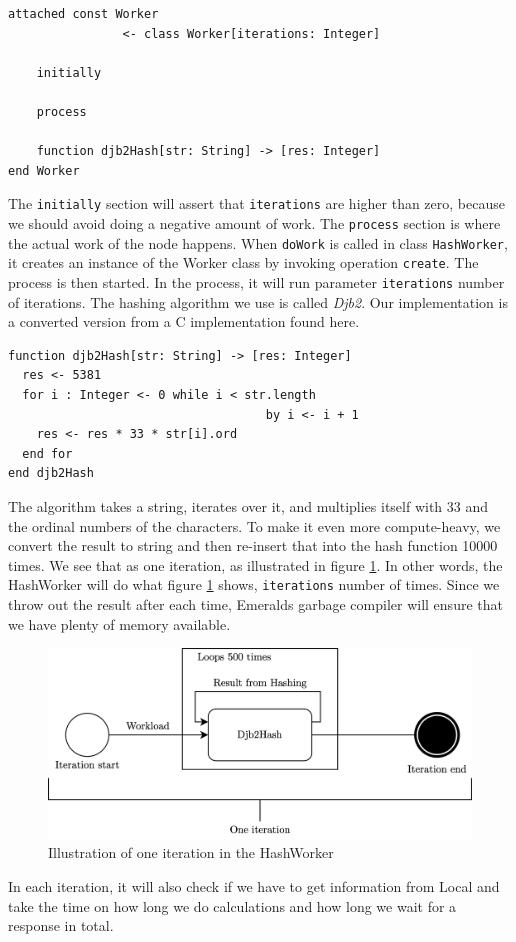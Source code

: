 \begin{minipage}{\linewidth}
\begin{lstlisting}[language=emerald]
attached const Worker 
                <- class Worker[iterations: Integer]
                
    initially
    
    process
    
    function djb2Hash[str: String] -> [res: Integer]
end Worker
\end{lstlisting}
\end{minipage}
The \verb|initially| section will assert that \verb|iterations| are higher than zero, because we should avoid doing a negative amount of work. The \verb|process| section is where the actual work of the node happens. When \verb|doWork| is called in class \verb|HashWorker|, it creates an instance of the Worker class by invoking operation \verb|create|. The process is then started. In the process, it will run parameter \verb|iterations| number of iterations. The hashing algorithm we use is called \textit{Djb2}. Our implementation is a converted version from a C implementation found here\cite{noauthor_hash_nodate}. 
\begin{lstlisting}[language=emerald]
function djb2Hash[str: String] -> [res: Integer]
  res <- 5381
  for i : Integer <- 0 while i < str.length 
                                    by i <- i + 1
    res <- res * 33 * str[i].ord
  end for
end djb2Hash
\end{lstlisting}
The algorithm takes a string, iterates over it, and multiplies itself with 33 and the ordinal numbers of the characters. To make it even more compute-heavy, we convert the result to string and then re-insert that into the hash function 10000 times. We see that as one iteration, as illustrated in figure \ref{fig:Hashing_algorithm_iteration}. In other words, the HashWorker will do what figure \ref{fig:Hashing_algorithm_iteration} shows, \verb|iterations| number of times. Since we throw out the result after each time, Emeralds garbage compiler will ensure that we have plenty of memory available. 
\begin{figure}[t]
    \centering
    \includegraphics[scale=0.9]{chapters/5_implementation/figures/Iteration.png}
    \caption{Illustration of one iteration in the HashWorker}
    \label{fig:Hashing_algorithm_iteration}
\end{figure}
In each iteration, it will also check if we have to get information from Local and take the time on how long we do calculations and how long we wait for a response in total.


